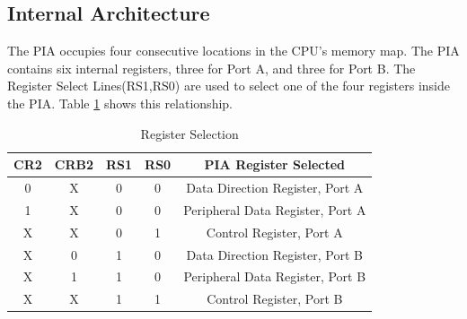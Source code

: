 \documentclass[12pt,Letter]{article}
\begin{document}
\subsection{Internal Architecture}
The PIA occupies four consecutive locations in the CPU's memory map. The PIA contains six internal registers, three for Port A, and three for Port B. The Register Select Lines(RS1,RS0) are used to select one of the four registers inside the PIA. Table \ref{tab:regselect} shows this relationship.
\begin{table}[H]
	\centering
	\begin{tabular}{c c c c|c}
		CR2	&	CRB2	&	RS1	&	RS0	&	PIA Register Selected \\
		\hline  \hline
		0 	&	X	&	0	&	0	&	Data Direction Register, Port A \\
		1	&	X	&	0	&	0	&	Peripheral Data Register, Port A \\
		X	&	X	&	0	&	1	&	Control Register, Port A \\
		X	&	0	&	1	&	0	&	Data Direction Register, Port B \\
		X	&	1	&	1	&	0	&	Peripheral Data Register, Port B \\
		X	&	X	&	1	&	1	&	Control Register, Port B
		
	\end{tabular}
	\caption{Register Selection}
	\label{tab:regselect}
\end{table}
\end{document}
